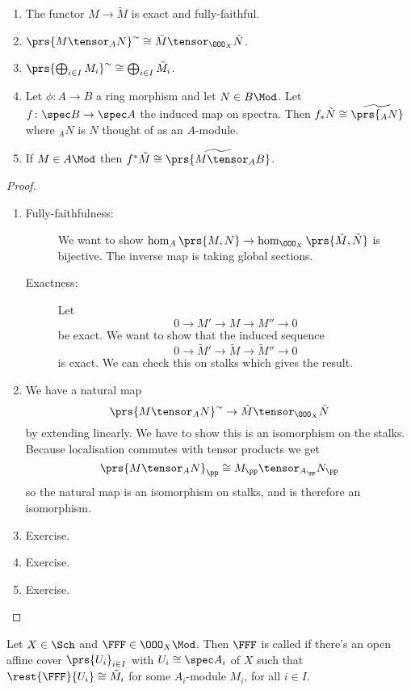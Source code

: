 \documentclass[10pt,a4paper,twoside,openany,hidelinks]{book}
\begin{document}
\begin{proposition}
\begin{enumerate}
\item The functor $M \to \tilde{M}$ is exact and fully-faithful.
\item $\prs{M \tensor_A N}^\sim \cong \tilde{M} \tensor_{\OOO_X} \tilde{N}$.
\item $\prs{\bigoplus_{i \in I} M_i}^{\sim} \cong \bigoplus_{i \in I} \tilde{M}_i$.
\item Let $\phi \colon A \to B$ a ring morphism and let $N \in B\Mod$. Let $f \colon \spec B \to \spec A$ the induced map on spectra.
Then $f_* \tilde{N} \cong \widetilde{\prs{_{A}N}}$ where ${}_A N$ is $N$ thought of as an $A$-module.
\item If $M \in A\Mod$ then $f^*\tilde{M} \cong \widetilde{\prs{M \tensor_A B}}$.
\end{enumerate}
\end{proposition}

\begin{proof}
\begin{enumerate}
\item
\begin{description}
\item[Fully-faithfulness:]
We want to show $\hom_A\prs{M,N} \to \hom_{\OOO_X}\prs{\tilde{M},\tilde{N}}$ is bijective. The inverse map is taking global sections.
\item[Exactness:]
Let \[0 \to M' \to M \to M'' \to 0\]
be exact. We want to show that the induced sequence
\[0 \to \tilde{M}' \to \tilde{M} \to \tilde{M}'' \to 0\]
is exact.
We can check this on stalks which gives the result.
\end{description}
\item We have a natural map
\[\prs{M \tensor_A N}^{\sim} \to \tilde{M} \tensor_{\OOO_X} \tilde{N}\]
by extending linearly.
We have to show this is an isomorphism on the stalks. Because localisation commutes with tensor products we get
\[\prs{M \tensor_A N}_{\pp} \cong M_\pp \tensor_{A_\pp} N_\pp\]
so the natural map is an isomorphism on stalks, and is therefore an isomorphism.

\item
Exercise.
\item
Exercise.
\item
Exercise.
\end{enumerate}
\end{proof}

\begin{definition}
Let $X \in \Sch$ and $\FFF \in \OOO_X\Mod$. Then $\FFF$ is called  if there's an open affine cover $\prs{U_i}_{i \in I}$ with $U_i \cong \spec A_i$ of $X$ such that $\rest{\FFF}{U_i} \cong \tilde{M}_i$ for some $A_i$-module $M_i$, for all $i \in I$.
\end{definition}
\end{document}
